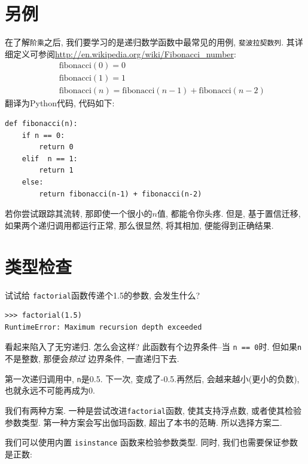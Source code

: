 \documentclass[10pt]{book}
\begin{document}
\section{另例}
\label{one.more.example}

在了解{\tt 阶乘}之后, 我们要学习的是递归数学函数中最常见的用例, 
{\tt 斐波拉契数列}. 
其详细定义可参阅\url{http://en.wikipedia.org/wiki/Fibonacci_number}:
%
\begin{eqnarray*}
&& \mathrm{fibonacci}(0) = 0 \\
&& \mathrm{fibonacci}(1) = 1 \\
&& \mathrm{fibonacci}(n) = \mathrm{fibonacci}(n-1) + \mathrm{fibonacci}(n-2)
\end{eqnarray*}
%
翻译为Python代码, 代码如下:

\begin{verbatim}
def fibonacci(n):
    if n == 0:
        return 0
    elif  n == 1:
        return 1
    else:
        return fibonacci(n-1) + fibonacci(n-2)
\end{verbatim}
%
若你尝试跟踪其流转, 那即使一个很小的$n$值, 都能令你头疼. 
但是, 基于置信迁移, 如果两个递归调用都运行正常, 那么很显然, 
将其相加, 便能得到正确结果. 


\section{类型检查}
\label{guardian}

试试给 {\tt factorial}函数传递个1.5的参数, 会发生什么?

\begin{verbatim}
>>> factorial(1.5)
RuntimeError: Maximum recursion depth exceeded
\end{verbatim}
%
看起来陷入了无穷递归. 怎么会这样? 此函数有个边界条件--当 {\tt n == 0}时. 
但如果{\tt n}不是整数, 那便会{\em 掠过} 边界条件, 一直递归下去. 

第一次递归调用中, { \tt n}是0.5. 
下一次, 变成了-0.5.再然后, 会越来越小(更小的负数), 
也就永远不可能再成为0.

我们有两种方案. 一种是尝试改进{\tt factorial}函数, 使其支持浮点数, 
或者使其检验参数类型. 
第一种方案会写出伽玛函数, 超出了本书的范畴. 所以选择方案二. 

我们可以使用内置 {\tt isinstance} 函数来检验参数类型. 
同时, 我们也需要保证参数是正数:
\end{document}
